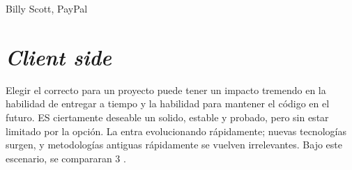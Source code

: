 %
%
%
%
%
%
%
%
%
%
%
%
%
%
%
%
%
%
%
%
%
%
%
%
%
Billy Scott, PayPal

\section{\textit{Client side}}

Elegir el \framework correcto para un proyecto puede tener un impacto tremendo en la habilidad de entregar a tiempo y la habilidad para mantener el código en el futuro. ES ciertamente deseable un \framework solido, estable y probado, pero sin estar limitado por la opción. La \web entra evolucionando rápidamente; nuevas tecnologías surgen, y metodologías antiguas rápidamente se vuelven irrelevantes. Bajo este escenario, se compararan 3 \frameworks.

